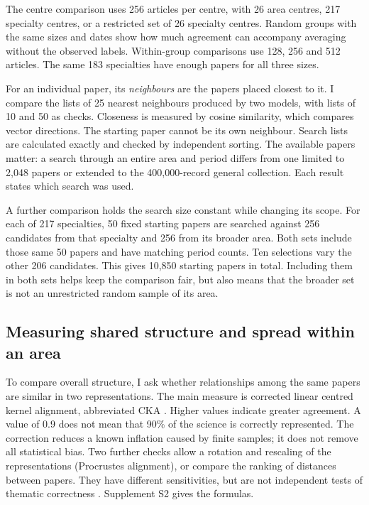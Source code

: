 \documentclass[12pt]{article}
\begin{document}
The centre comparison uses 256 articles per centre, with 26 area centres, 217 specialty centres, or a restricted set of 26 specialty centres. Random groups with the same sizes and dates show how much agreement can accompany averaging without the observed labels. Within-group comparisons use 128, 256 and 512 articles. The same 183 specialties have enough papers for all three sizes.

For an individual paper, its \emph{neighbours} are the papers placed closest to it. I compare the lists of 25 nearest neighbours produced by two models, with lists of 10 and 50 as checks. Closeness is measured by cosine similarity, which compares vector directions. The starting paper cannot be its own neighbour. Search lists are calculated exactly and checked by independent sorting. The available papers matter: a search through an entire area and period differs from one limited to 2,048 papers or extended to the 400,000-record general collection. Each result states which search was used.

A further comparison holds the search size constant while changing its scope. For each of 217 specialties, 50 fixed starting papers are searched against 256 candidates from that specialty and 256 from its broader area. Both sets include those same 50 papers and have matching period counts. Ten selections vary the other 206 candidates. This gives 10,850 starting papers in total. Including them in both sets helps keep the comparison fair, but also means that the broader set is not an unrestricted random sample of its area.

\subsection{Measuring shared structure and spread within an area}
To compare overall structure, I ask whether relationships among the same papers are similar in two representations. The main measure is corrected linear centred kernel alignment, abbreviated CKA \citep{pmlr-v97-kornblith19a,refa961d84a4e}. Higher values indicate greater agreement. A value of 0.9 does not mean that 90\% of the science is correctly represented. The correction reduces a known inflation caused by finite samples; it does not remove all statistical bias. Two further checks allow a rotation and rescaling of the representations (Procrustes alignment), or compare the ranking of distances between papers. They have different sensitivities, but are not independent tests of thematic correctness \citep{NEURIPS2021_252a3dba,pmlr-v285-williams24a}. Supplement S2 gives the formulas.
\end{document}

